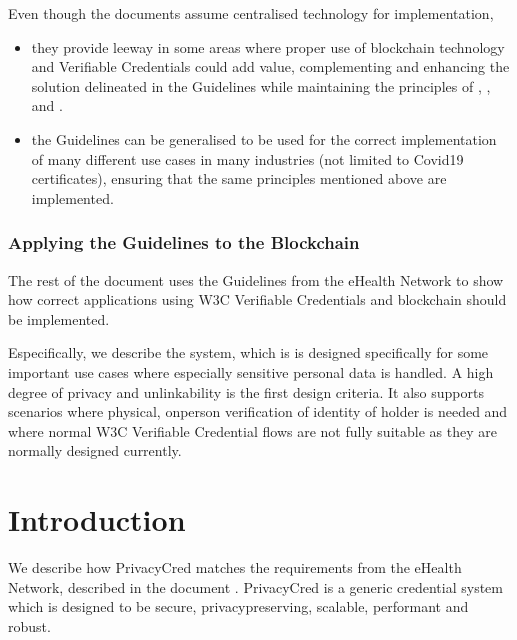 \documentclass[a4paper,12pt,english]{sphinxhowto}
\begin{document}
\sphinxAtStartPar
Even though the documents assume centralised technology for implementation,
\begin{itemize}
\item {} 
\sphinxAtStartPar
they provide leeway in some areas where proper use of blockchain technology and Verifiable Credentials could add value, complementing and enhancing the solution delineated in the Guidelines while maintaining the principles of , ,  and .

\item {} 
\sphinxAtStartPar
the Guidelines can be generalised to be used for the correct implementation of many different use cases in many industries (not limited to Covid\sphinxhyphen{}19 certificates), ensuring that the same principles mentioned above are implemented.

\end{itemize}
\subsubsection*{Applying the Guidelines to the Blockchain}

\sphinxAtStartPar
The rest of the document uses the Guidelines from the eHealth Network to show how correct applications using W3C Verifiable Credentials and blockchain should be implemented.

\sphinxAtStartPar
Especifically, we describe the {\hyperref[\detokenize{ssi/privacycred::doc}]{}} system, which is is
designed specifically for some important use cases where especially sensitive personal
data is handled. A high degree of privacy and unlinkability is the first design criteria.
It also supports scenarios where physical, on\sphinxhyphen{}person verification of identity of holder is
needed and where normal W3C Verifiable Credential flows are not fully suitable as they are
normally designed currently.


\section{Introduction}
\label{\detokenize{ssi/introduction:introduction}}\label{\detokenize{ssi/introduction::doc}}
\sphinxAtStartPar
We describe how PrivacyCred matches the requirements from the eHealth Network, described in the document .
PrivacyCred is a generic credential system which is designed to be secure, privacy\sphinxhyphen{}preserving, scalable, performant and robust.
\end{document}

